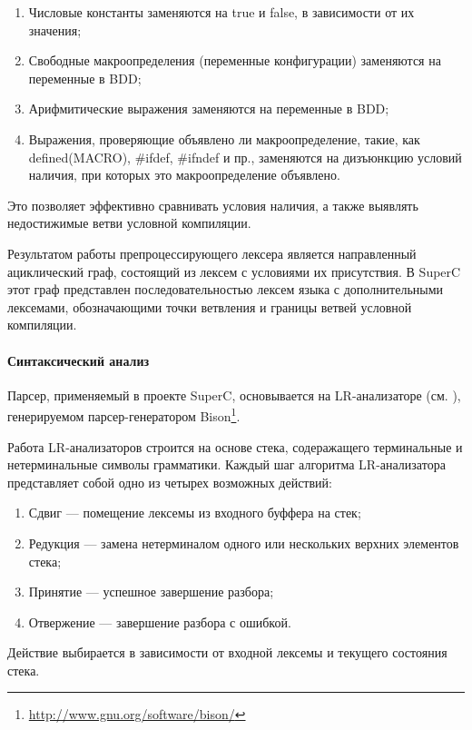 \begin{enumerate}
\item Числовые константы заменяются на true и false, в зависимости от их значения;
\item Свободные макроопределения (переменные конфигурации) заменяются на переменные в BDD;
\item Арифмитические выражения заменяются на переменные в BDD;
\item Выражения, проверяющие объявлено ли макроопределение, такие, как  defined(MACRO), \#ifdef, \#ifndef и пр., заменяются на дизъюнкцию условий наличия, при которых это макроопределение объявлено.
\end{enumerate}

Это позволяет эффективно сравнивать условия наличия, а также выявлять недостижимые ветви условной компиляции.
 
Результатом работы препроцессирующего лексера является направленный ациклический граф, состоящий из лексем с условиями их присутствия. В SuperC этот граф представлен последовательностью лексем языка с дополнительными лексемами, обозначающими точки ветвления и границы ветвей условной компиляции.

\paragraph{Синтаксический анализ}

Парсер, применяемый в проекте SuperC, основывается на LR-анализаторе (см. \cite{aho}), генерируемом парсер-генератором Bison\footnote{\url{http://www.gnu.org/software/bison/}}.

Работа LR-анализаторов строится на основе стека, содеражащего терминальные и нетерминальные символы грамматики. Каждый шаг алгоритма LR-анализатора представляет собой одно из четырех возможных действий: 

\begin{enumerate}
\item Сдвиг --- помещение лексемы из входного буффера на стек;
\item Редукция --- замена нетерминалом одного или нескольких верхних элементов стека;
\item Принятие --- успешное завершение разбора;
\item Отвержение --- завершение разбора с ошибкой. 
\end{enumerate}

Действие выбирается в зависимости от входной лексемы и текущего состояния стека.

